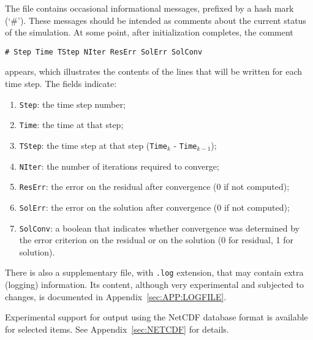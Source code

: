 The file contains occasional informational messages,
prefixed by a hash mark (`\#').
These messages should be intended as comments about the current status
of the simulation.
At some point, after initialization completes, the comment
\begin{verbatim}
# Step Time TStep NIter ResErr SolErr SolConv
\end{verbatim}
appears, which illustrates the contents of the lines that will be written
for each time step.
The fields indicate:
\begin{enumerate}
\item \texttt{Step}: the time step number;
\item \texttt{Time}: the time at that step;
\item \texttt{TStep}: the time step at that step
	(\texttt{Time}$_k$ - \texttt{Time}$_{k-1}$);
\item \texttt{NIter}: the number of iterations required to converge;
\item \texttt{ResErr}: the error on the residual after convergence
	(0 if not computed);
\item \texttt{SolErr}: the error on the solution after convergence
	(0 if not computed);
\item \texttt{SolConv}: a boolean that indicates whether convergence
	was determined by the error criterion on the residual
	or on the solution (0 for residual, 1 for solution).
\end{enumerate}

There is also a supplementary file, with \texttt{.log} extension,
that may contain extra (logging) information.
Its content, although very experimental and subjected to changes,
is documented in Appendix~\ref{sec:APP:LOGFILE}.

\bigskip

Experimental support for output using the NetCDF database format
is available for selected items.
See Appendix~\ref{sec:NETCDF} for details.

